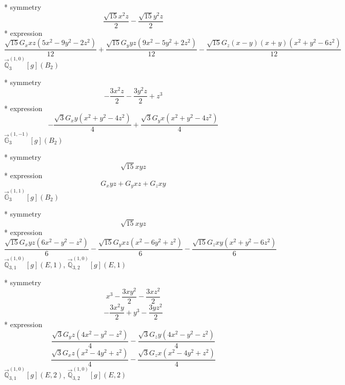 \documentclass[fleqn,8pt]{jsarticle}
\begin{document}
\noindent\quad ** symmetry
\begin{dmath*}
\frac{\sqrt{15} x^{2} z}{2} - \frac{\sqrt{15} y^{2} z}{2}
\end{dmath*}
\noindent\quad ** expression
\begin{dmath*}
\frac{\sqrt{15} G_{x} x z \left(5 x^{2} - 9 y^{2} - 2 z^{2}\right)}{12} + \frac{\sqrt{15} G_{y} y z \left(9 x^{2} - 5 y^{2} + 2 z^{2}\right)}{12} - \frac{\sqrt{15} G_{z} \left(x - y\right) \left(x + y\right) \left(x^{2} + y^{2} - 6 z^{2}\right)}{12}
\end{dmath*}
\noindent\quad $\vec{\mathbb{Q}}_{3}^{(1,0)}[g](B_{2})$

\noindent\quad ** symmetry
\begin{dmath*}
- \frac{3 x^{2} z}{2} - \frac{3 y^{2} z}{2} + z^{3}
\end{dmath*}
\noindent\quad ** expression
\begin{dmath*}
- \frac{\sqrt{3} G_{x} y \left(x^{2} + y^{2} - 4 z^{2}\right)}{4} + \frac{\sqrt{3} G_{y} x \left(x^{2} + y^{2} - 4 z^{2}\right)}{4}
\end{dmath*}
\noindent\quad $\vec{\mathbb{G}}_{3}^{(1,-1)}[g](B_{2})$

\noindent\quad ** symmetry
\begin{dmath*}
\sqrt{15} x y z
\end{dmath*}
\noindent\quad ** expression
\begin{dmath*}
G_{x} y z + G_{y} x z + G_{z} x y
\end{dmath*}
\noindent\quad $\vec{\mathbb{G}}_{3}^{(1,1)}[g](B_{2})$

\noindent\quad ** symmetry
\begin{dmath*}
\sqrt{15} x y z
\end{dmath*}
\noindent\quad ** expression
\begin{dmath*}
\frac{\sqrt{15} G_{x} y z \left(6 x^{2} - y^{2} - z^{2}\right)}{6} - \frac{\sqrt{15} G_{y} x z \left(x^{2} - 6 y^{2} + z^{2}\right)}{6} - \frac{\sqrt{15} G_{z} x y \left(x^{2} + y^{2} - 6 z^{2}\right)}{6}
\end{dmath*}
\noindent\quad $\vec{\mathbb{Q}}_{3,1}^{(1,0)}[g](E,1)$, $\vec{\mathbb{Q}}_{3,2}^{(1,0)}[g](E,1)$

\noindent\quad ** symmetry
\begin{dmath*}
x^{3} - \frac{3 x y^{2}}{2} - \frac{3 x z^{2}}{2}
\end{dmath*}
\begin{dmath*}
- \frac{3 x^{2} y}{2} + y^{3} - \frac{3 y z^{2}}{2}
\end{dmath*}
\noindent\quad ** expression
\begin{dmath*}
\frac{\sqrt{3} G_{y} z \left(4 x^{2} - y^{2} - z^{2}\right)}{4} - \frac{\sqrt{3} G_{z} y \left(4 x^{2} - y^{2} - z^{2}\right)}{4}
\end{dmath*}
\begin{dmath*}
\frac{\sqrt{3} G_{x} z \left(x^{2} - 4 y^{2} + z^{2}\right)}{4} - \frac{\sqrt{3} G_{z} x \left(x^{2} - 4 y^{2} + z^{2}\right)}{4}
\end{dmath*}
\noindent\quad $\vec{\mathbb{Q}}_{3,1}^{(1,0)}[g](E,2)$, $\vec{\mathbb{Q}}_{3,2}^{(1,0)}[g](E,2)$
\end{document}
